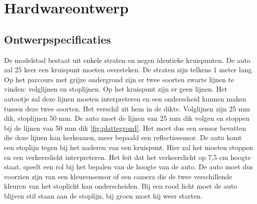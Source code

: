 \documentclass[a4paper,twoside,kulak]{kulakreport} %
\begin{document}
\section{Hardwareontwerp} \label{Hardwareontwerp}

\subsection{Ontwerpspecificaties} \label{Ontwerpspecificaties}


De modelstad bestaat uit enkele straten en negen identieke kruispunten. De auto zal 25 keer een kruispunt moeten oversteken. De straten zijn telkens 1 meter lang. Op het parcours met grijze ondergrond zijn er twee soorten zwarte lijnen te vinden: volglijnen en stoplijnen. Op het kruispunt  zijn er geen lijnen. Het autootje zal deze lijnen moeten interpreteren en een onderscheid kunnen maken tussen deze twee soorten. Het verschil zit hem in de dikte. Volglijnen zijn 25 mm dik, stoplijnen 50 mm. De auto moet de lijnen van 25 mm dik volgen en stoppen bij de lijnen van 50 mm dik \ref{fig:plattegrond}. Het moet dus een sensor bevatten die deze lijnen kan herkennen, meer bepaald een reflectiesensor. De auto komt een stoplijn tegen bij het naderen van een kruispunt. Hier zal het moeten stoppen en een verkeerslicht interpreteren. Het feit dat het verkeerslicht op 7,5 cm hoogte staat, speelt een rol bij het bepalen van de hoogte van de auto. De auto moet dus voorzien zijn van een kleurensensor of een camera die de twee verschillende kleuren van het stoplicht kan onderscheiden. Bij een rood licht moet de auto blijven stil staan aan de stoplijn, bij groen moet hij weer starten.
\end{document}
